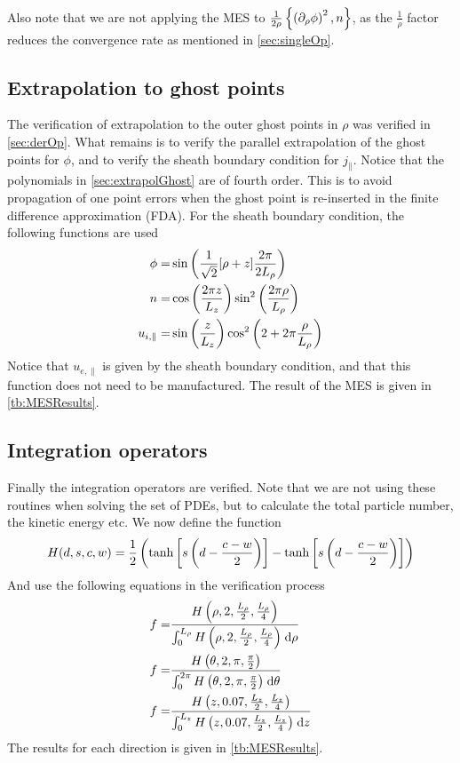 Also note that we are not applying the MES to $\frac{1}{2\rho}\left\{\left(\partial_{\rho} \phi\right)^2,n\right\}$, as the $\frac{1}{\rho}$ factor reduces the convergence rate as mentioned in \cref{sec:singleOp}.

\subsection{Extrapolation to ghost points}
%
The verification of extrapolation to the outer ghost points in $\rho$ was verified in \cref{sec:derOp}.
What remains is to verify the parallel extrapolation of the ghost points for $\phi$, and to verify the sheath boundary condition for $j_{\|}$.
Notice that the polynomials in \cref{sec:extrapolGhost} are of fourth order.
This is to avoid propagation of one point errors when the ghost point is re-inserted in the finite difference approximation (FDA).
For the sheath boundary condition, the following functions are used
%
\begin{align}
    \phi =& \sin\left(\frac{1}{\sqrt{2}}[\rho + z]\frac{2\pi}{2L_\rho}\right)
    \label{eq:MESPhiSheath}
    \\
    n =& \cos\left(\frac{2\pi z}{L_z}\right)\sin^2\left(\frac{2\pi\rho}{L_\rho}\right)
    \label{eq:MESNSheath}
    \\
    u_{i, \|} =& \sin\left(\frac{z}{L_z}\right)\cos^2\left(2+2\pi\frac{\rho}{L_\rho}\right)
    \label{eq:MEUISheath}
\end{align}
%
Notice that $u_{e,\|}$ is given by the sheath boundary condition, and that this function does not need to be manufactured.
The result of the MES is given in \cref{tb:MESResults}.

\subsection{Integration operators}
%
Finally the integration operators are verified.
Note that we are not using these routines when solving the set of PDEs, but to calculate the total particle number, the kinetic energy etc.
We now define the function
%
\begin{align*}
    H(d,s,c,w) = \frac{1}{2}\left(\tanh\left[s\left(d-\frac{c-w}{2}\right)\right]-\tanh\left[s\left(d-\frac{c-w}{2}\right)\right]\right)
\end{align*}
%
And use the following equations in the verification process
%
\begin{align}
f =& \frac{H\left(\rho, 2,\frac{L_\rho}{2}, \frac{L_\rho}{4}\right)}{\int_{0}^{L_\rho} {H\left(\rho, 2,\frac{L_\rho}{2}, \frac{L_\rho}{4}\right)} \; \text{d} {\rho}}
\label{eq:MESRhoInt}
\\
f =& \frac{H\left(\theta, 2,\pi, \frac{\pi}{2}\right)}{\int_{0}^{2\pi} {H\left(\theta, 2,\pi, \frac{\pi}{2}\right)} \; \text{d} {\theta}}
\label{eq:MESThetaInt}
\\
f =& \frac{H\left(z, 0.07,\frac{L_z}{2}, \frac{L_z}{4}\right)}{\int_{0}^{L_z} {H\left(z, 0.07,\frac{L_z}{2}, \frac{L_z}{4}\right)} \; \text{d} {z}}
\label{eq:MESZInt}
\end{align}
%
The results for each direction is given in \cref{tb:MESResults}.


